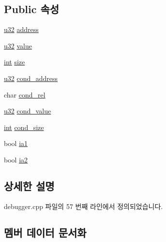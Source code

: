 \subsection*{Public 속성}
\begin{DoxyCompactItemize}
\item 
\mbox{\hyperlink{_system_8h_a10e94b422ef0c20dcdec20d31a1f5049}{u32}} \mbox{\hyperlink{structbreakpoint_info_ab0cc4bdc931703296ec18aaa1e2242f4}{address}}
\item 
\mbox{\hyperlink{_system_8h_a10e94b422ef0c20dcdec20d31a1f5049}{u32}} \mbox{\hyperlink{structbreakpoint_info_a10cf821e6c0c5b11b921baafa0144448}{value}}
\item 
\mbox{\hyperlink{_util_8cpp_a0ef32aa8672df19503a49fab2d0c8071}{int}} \mbox{\hyperlink{structbreakpoint_info_a39a2c2fabe9c630917e8131a99ce61ec}{size}}
\item 
\mbox{\hyperlink{_system_8h_a10e94b422ef0c20dcdec20d31a1f5049}{u32}} \mbox{\hyperlink{structbreakpoint_info_a4a83f60b18f30afe9fa114b21f02de22}{cond\+\_\+address}}
\item 
char \mbox{\hyperlink{structbreakpoint_info_a6819ea8a99055196410b1070f9750f70}{cond\+\_\+rel}}
\item 
\mbox{\hyperlink{_system_8h_a10e94b422ef0c20dcdec20d31a1f5049}{u32}} \mbox{\hyperlink{structbreakpoint_info_a06f4bafc5e974ae0adf0e3bf651d2afd}{cond\+\_\+value}}
\item 
\mbox{\hyperlink{_util_8cpp_a0ef32aa8672df19503a49fab2d0c8071}{int}} \mbox{\hyperlink{structbreakpoint_info_a4c2f4f1b0f74562121d829e864d73a0e}{cond\+\_\+size}}
\item 
bool \mbox{\hyperlink{structbreakpoint_info_a6d1174b3ac7266b9454683ee36030b97}{ia1}}
\item 
bool \mbox{\hyperlink{structbreakpoint_info_a5c43894b7302cbb085204b39a14dda91}{ia2}}
\end{DoxyCompactItemize}


\subsection{상세한 설명}


debugger.\+cpp 파일의 57 번째 라인에서 정의되었습니다.



\subsection{멤버 데이터 문서화}
\mbox{\label{structbreakpoint_info_ab0cc4bdc931703296ec18aaa1e2242f4}} 
